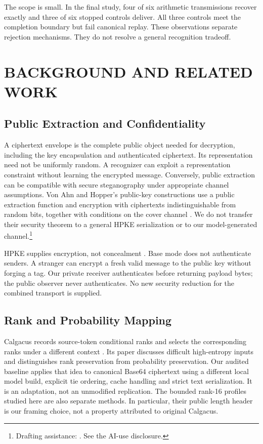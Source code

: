 \documentclass[a4paper,twoside]{article}
\newcommand{\aidraft}{\footnote{Drafting assistance: \cite{openai2026codex}. See the AI-use disclosure.}}
\begin{document}
The scope is small. In the final study, four of six arithmetic transmissions recover exactly and three of six stopped controls deliver. All three controls meet the completion boundary but fail canonical replay. These observations separate rejection mechanisms. They do not resolve a general recognition tradeoff.

\section{BACKGROUND AND RELATED WORK}
\label{sec:related}
\subsection{Public Extraction and Confidentiality}
\noindent A ciphertext envelope is the complete public object needed for decryption, including the key encapsulation and authenticated ciphertext. Its representation need not be uniformly random. A recognizer can exploit a representation constraint without learning the encrypted message. Conversely, public extraction can be compatible with secure steganography under appropriate channel assumptions. Von Ahn and Hopper's public-key constructions use a public extraction function and encryption with ciphertexts indistinguishable from random bits, together with conditions on the cover channel \cite{vonahn2004public}. We do not transfer their security theorem to a general HPKE serialization or to our model-generated channel.\aidraft

HPKE supplies encryption, not concealment \cite{rfc9180}. Base mode does not authenticate senders. A stranger can encrypt a fresh valid message to the public key without forging a tag. Our private receiver authenticates before returning payload bytes; the public observer never authenticates. No new security reduction for the combined transport is supplied.

\subsection{Rank and Probability Mapping}
\noindent Calgacus records source-token conditional ranks and selects the corresponding ranks under a different context \cite{norelli2026calgacus}. Its paper discusses difficult high-entropy inputs and distinguishes rank preservation from probability preservation. Our audited baseline applies that idea to canonical Base64 ciphertext using a different local model build, explicit tie ordering, cache handling and strict text serialization. It is an adaptation, not an unmodified replication. The bounded rank-16 profiles studied here are also separate methods. In particular, their public length header is our framing choice, not a property attributed to original Calgacus.
\end{document}
